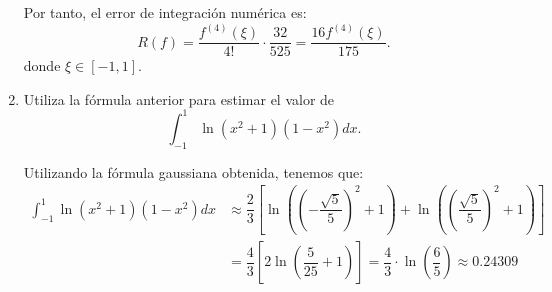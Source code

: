 \begin{ejercicio}
\begin{enumerate}
        Por tanto, el error de integración numérica es:
        \begin{equation*}
            R(f) = \dfrac{f^{(4)}(\xi)}{4!}\cdot \dfrac{32}{525} = \dfrac{16f^{(4)}(\xi)}{175}.
        \end{equation*}
        donde $\xi\in [-1, 1]$.
        \item Utiliza la fórmula anterior para estimar el valor de
        \begin{equation*}
            \int_{-1}^{1} \ln(x^2 + 1)(1 - x^2)dx .
        \end{equation*}

        Utilizando la fórmula gaussiana obtenida, tenemos que:
        \begin{align*}
            \int_{-1}^{1} \ln(x^2 + 1)(1 - x^2)dx &\approx \dfrac{2}{3}\left[\ln\left(\left(-\dfrac{\sqrt{5}}{5}\right)^2 + 1\right) + \ln\left(\left(\dfrac{\sqrt{5}}{5}\right)^2 + 1\right)\right]\\
            &= \dfrac{4}{3}\left[2\ln\left(\dfrac{5}{25} + 1\right)\right] = \dfrac{4}{3}\cdot \ln\left(\dfrac{6}{5}\right) \approx 0.24309
        \end{align*}
    \end{enumerate}
\end{ejercicio}

